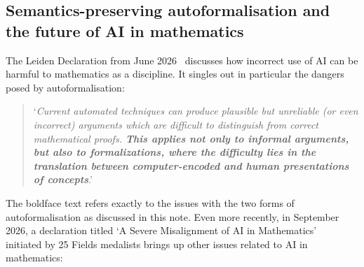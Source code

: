 \documentclass[10pt, a4paper, reqno]{amsart}
\numberwithin{equation}{section}
\theoremstyle{definition}
\theoremstyle{definition}
\begin{document}
\subsection{Semantics-preserving autoformalisation and the future of AI in mathematics}
The Leiden Declaration from June 2026~\cite{Leiden2026} discusses how incorrect use of AI can be harmful to mathematics as a discipline. It singles out in particular the dangers posed by autoformalisation:
\begin{quote}
	`\textit{Current automated techniques can produce plausible but unreliable (or even incorrect) arguments which are difficult to distinguish from correct mathematical proofs. \textbf{This applies not only to informal arguments, but also to formalizations, where the difficulty lies in the translation between computer-encoded and human presentations of concepts}}.'
\end{quote}
The boldface text refers exactly to the issues with the two forms of autoformalisation as discussed in this note. 
Even more recently, in September 2026, a declaration titled `A Severe Misalignment of AI in Mathematics'~\cite{Misalignment2026} initiated by 25 Fields medalists brings up other issues related to AI in mathematics:
\end{document}
